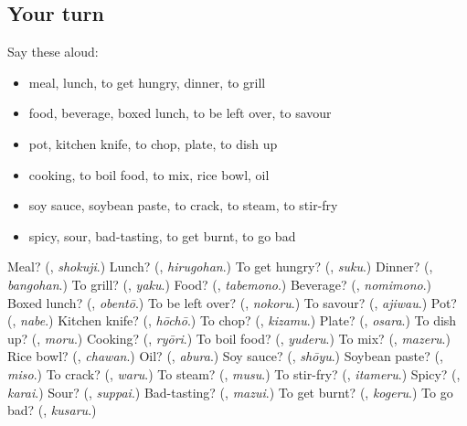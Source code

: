 \subsection*{Your turn}
Say these aloud:

\begin{itemize}
\raggedright
  \item meal, lunch, to get hungry, dinner, to grill
  \item food, beverage, boxed lunch, to be left over, to savour
  \item pot, kitchen knife, to chop, plate, to dish up
  \item cooking, to boil food, to mix, rice bowl, oil
  \item soy sauce, soybean paste, to crack, to steam, to stir-fry
  \item spicy, sour, bad-tasting, to get burnt, to go bad
\end{itemize}

\begin{tcolorbox}[breakable,colback=teal!4,colframe=teal!35!black,title={Before you move on}]
Meal? (\textbf{}, \emph{shokuji}.) Lunch? (\textbf{}, \emph{hirugohan}.) To get hungry? (\textbf{}, \emph{suku}.) Dinner? (\textbf{}, \emph{bangohan}.) To grill? (\textbf{}, \emph{yaku}.) Food? (\textbf{}, \emph{tabemono}.) Beverage? (\textbf{}, \emph{nomimono}.) Boxed lunch? (\textbf{}, \emph{obentō}.) To be left over? (\textbf{}, \emph{nokoru}.) To savour? (\textbf{}, \emph{ajiwau}.) Pot? (\textbf{}, \emph{nabe}.) Kitchen knife? (\textbf{}, \emph{hōchō}.) To chop? (\textbf{}, \emph{kizamu}.) Plate? (\textbf{}, \emph{osara}.) To dish up? (\textbf{}, \emph{moru}.) Cooking? (\textbf{}, \emph{ryōri}.) To boil food? (\textbf{}, \emph{yuderu}.) To mix? (\textbf{}, \emph{mazeru}.) Rice bowl? (\textbf{}, \emph{chawan}.) Oil? (\textbf{}, \emph{abura}.) Soy sauce? (\textbf{}, \emph{shōyu}.) Soybean paste? (\textbf{}, \emph{miso}.) To crack? (\textbf{}, \emph{waru}.) To steam? (\textbf{}, \emph{musu}.) To stir-fry? (\textbf{}, \emph{itameru}.) Spicy? (\textbf{}, \emph{karai}.) Sour? (\textbf{}, \emph{suppai}.) Bad-tasting? (\textbf{}, \emph{mazui}.) To get burnt? (\textbf{}, \emph{kogeru}.) To go bad? (\textbf{}, \emph{kusaru}.)
\end{tcolorbox}
